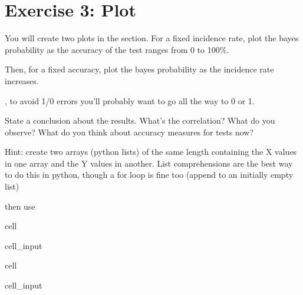 \documentclass[letterpaper,10pt,english]{jupyterBook}
\begin{document}
\section{Exercise 3: Plot}
\label{\detokenize{lessons/Bayes_Theorem_Student:exercise-3-plot}}
\sphinxAtStartPar
You will create two plots in the section. For a fixed incidence rate, plot the bayes probability as the accuracy of the test ranges from 0 to 100\%.

\sphinxAtStartPar
Then, for a fixed accuracy, plot the bayes probability as the incidence rate increases.

\sphinxAtStartPar
{}, to avoid 1/0 errors you’ll probably want to  go all the way to 0 or 1.

\sphinxAtStartPar
State a conclusion about the results. What’s the correlation? What do you observe? What do you think about accuracy measures for tests now?

\sphinxAtStartPar
Hint: create two arrays  (python lists) of the same length containing the X values in one array and the Y values in another. List comprehensions are the best way to do this in python, though a for loop is fine too (append to an initially empty list)

\sphinxAtStartPar
then use 

\begin{sphinxuseclass}{cell}\begin{sphinxVerbatimInput}

\begin{sphinxuseclass}{cell_input}
\begin{sphinxVerbatim}[commandchars=\\\{\}]
     
\end{sphinxVerbatim}

\end{sphinxuseclass}\end{sphinxVerbatimInput}

\end{sphinxuseclass}
\begin{sphinxuseclass}{cell}\begin{sphinxVerbatimInput}

\begin{sphinxuseclass}{cell_input}
\begin{sphinxVerbatim}[commandchars=\\\{\}]
\end{sphinxVerbatim}

\end{sphinxuseclass}\end{sphinxVerbatimInput}

\end{sphinxuseclass}
\end{document}
